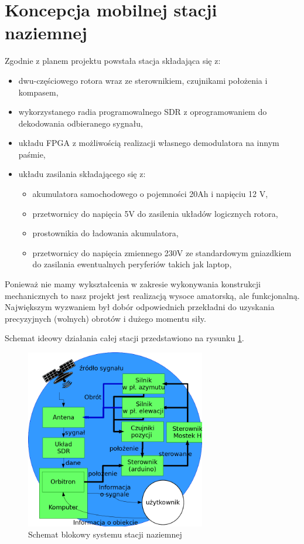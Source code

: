 \section{Koncepcja mobilnej stacji naziemnej}

Zgodnie z planem projektu powstała stacja składająca się z:

\begin{itemize}
 \item dwu-częściowego rotora wraz ze sterownikiem, czujnikami położenia i kompasem,
 \item wykorzystanego radia programowalnego SDR z oprogramowaniem do dekodowania odbieranego sygnału,
 \item układu FPGA z możliwością realizacji własnego demodulatora na innym paśmie,
 \item układu zasilania składającego się z: 
    \begin{itemize}
    \item akumulatora samochodowego o pojemności 20Ah i napięciu 12 V,
    \item przetwornicy do napięcia 5V do zasilenia układów logicznych rotora,
    \item prostownikia do ładowania akumulatora,
    \item przetwornicy do napięcia zmiennego 230V ze standardowym gniazdkiem do zasilania ewentualnych peryferiów takich jak laptop,
    \end{itemize}
\end{itemize}

Ponieważ nie mamy wykształcenia w zakresie wykonywania konstrukcji mechanicznych to nasz projekt jest realizacją wysoce amatorską, ale funkcjonalną. Największym wyzwaniem był dobór odpowiednich przekładni do uzyskania precyzyjnych (wolnych) obrotów i dużego momentu siły.

Schemat ideowy działania całej stacji przedstawiono na rysunku \ref{stacschem}.

\begin{figure}[!htbp]
    \centering
    \includegraphics[width=0.7\textwidth]{schemat_skik2017}
    \caption{Schemat blokowy systemu stacji naziemnej}
    \label{stacschem}
\end{figure}

